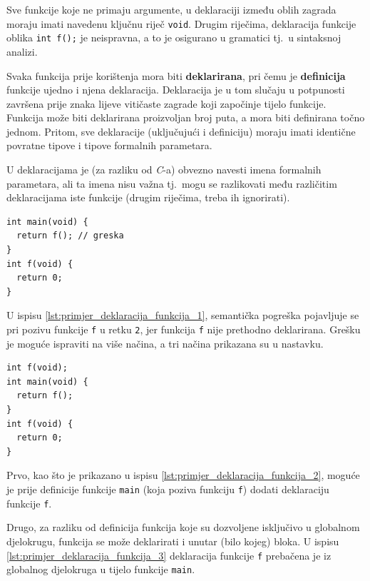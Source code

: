 \documentclass[times, 12pt, utf8]{book}
\begin{document}
Sve funkcije koje ne primaju argumente, u deklaraciji između oblih zagrada moraju imati navedenu ključnu riječ \verb|void|.
Drugim riječima, deklaracija funkcije oblika \verb|int f();| je neispravna, a to je osigurano u gramatici tj.~u sintaksnoj analizi.

Svaka funkcija prije korištenja mora biti \textbf{deklarirana}, pri čemu je \textbf{definicija} funkcije ujedno i njena deklaracija.
Deklaracija je u tom slučaju u potpunosti završena prije znaka lijeve vitičaste zagrade koji započinje tijelo funkcije.
Funkcija može biti deklarirana proizvoljan broj puta, a mora biti definirana točno jednom.
Pritom, sve deklaracije (uključujući i definiciju) moraju imati identične povratne tipove i tipove formalnih parametara.

U deklaracijama je (za razliku od \emph{C}-a) obvezno navesti imena formalnih parametara, ali ta imena nisu važna tj.~mogu se razlikovati među različitim deklaracijama iste funkcije (drugim riječima, treba ih ignorirati).

\begin{lstlisting}[caption={Funkcija \texttt{f} nije deklarirana prije korištenja.},label=lst:primjer_deklaracija_funkcija_1]
int main(void) {
  return f(); // greska
}
int f(void) {
  return 0;
}
\end{lstlisting}

U ispisu \ref{lst:primjer_deklaracija_funkcija_1}, semantička pogreška pojavljuje se pri pozivu funkcije \verb|f| u retku \verb|2|, jer funkcija \verb|f| nije prethodno deklarirana.
Grešku je moguće ispraviti na više načina, a tri načina prikazana su u nastavku.

\begin{lstlisting}[caption={Dodatak deklaracije funkcije \texttt{f} prije definicije funkcije \texttt{main}.},label=lst:primjer_deklaracija_funkcija_2]
int f(void);
int main(void) {
  return f();
}
int f(void) {
  return 0;
}
\end{lstlisting}

Prvo, kao što je prikazano u ispisu \ref{lst:primjer_deklaracija_funkcija_2}, moguće je prije definicije funkcije \verb|main| (koja poziva funkciju \verb|f|) dodati deklaraciju funkcije \verb|f|.

Drugo, za razliku od definicija funkcija koje su dozvoljene isključivo u globalnom djelokrugu, funkcija se može deklarirati i unutar (bilo kojeg) bloka.
U ispisu \ref{lst:primjer_deklaracija_funkcija_3} deklaracija funkcije \verb|f| prebačena je iz globalnog djelokruga u tijelo funkcije \verb|main|.
\end{document}
